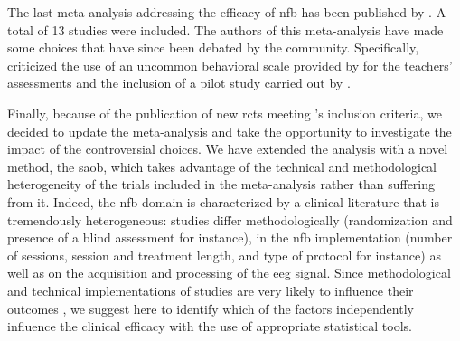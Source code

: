 The last meta-analysis addressing the efficacy of \gls{nfb} has been published by \citet{Cortese2016}. A total of 13
studies were included. The authors of this meta-analysis have made some choices that
have since been debated by the community. Specifically, \citet{Micoulaud2016} criticized the use of an uncommon
behavioral scale provided by \citet{Steiner2014} for the teachers' assessments and the inclusion of a pilot study
carried out by \citet{Arnold2014}. 

Finally, because of the publication of new \glspl{rct} meeting \citeauthor{Cortese2016}'s inclusion criteria, we
decided to update the meta-analysis and take the opportunity to investigate the impact of the controversial choices.
We have extended the analysis with a novel method, the \gls{saob}, which takes advantage of the technical and
methodological heterogeneity of the trials included in the meta-analysis rather than suffering from it. Indeed, the \gls{nfb} domain is 
characterized by a clinical literature that is tremendously heterogeneous: studies differ methodologically (randomization and 
presence of a blind assessment for instance), in the \gls{nfb} implementation (number of sessions, session and treatment length,
and type of protocol for instance) as well as on the acquisition and processing of the \gls{eeg} signal. Since
methodological and technical implementations of studies are very likely to influence their outcomes \citep{Congedo2004}, we suggest here to 
identify which of the factors independently influence the clinical efficacy with the use of appropriate statistical tools.






